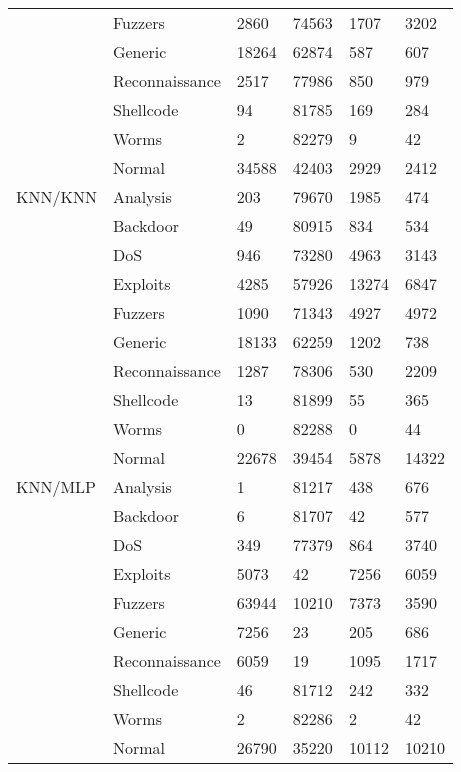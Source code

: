 \begin{longtable}{@{}llllll@{}}
        & Fuzzers        & 2860  & 74563 & 1707  & 3202  \\
        & Generic        & 18264 & 62874 & 587   & 607   \\
        & Reconnaissance & 2517  & 77986 & 850   & 979   \\
        & Shellcode      & 94    & 81785 & 169   & 284   \\
        & Worms          & 2     & 82279 & 9     & 42    \\
        & Normal         & 34588 & 42403 & 2929  & 2412  \\
KNN/KNN & Analysis       & 203   & 79670 & 1985  & 474   \\
        & Backdoor       & 49    & 80915 & 834   & 534   \\
        & DoS            & 946   & 73280 & 4963  & 3143  \\
        & Exploits       & 4285  & 57926 & 13274 & 6847  \\
        & Fuzzers        & 1090  & 71343 & 4927  & 4972  \\
        & Generic        & 18133 & 62259 & 1202  & 738   \\
        & Reconnaissance & 1287  & 78306 & 530   & 2209  \\
        & Shellcode      & 13    & 81899 & 55    & 365   \\
        & Worms          & 0     & 82288 & 0     & 44    \\
        & Normal         & 22678 & 39454 & 5878  & 14322 \\
KNN/MLP & Analysis       & 1     & 81217 & 438   & 676   \\
        & Backdoor       & 6     & 81707 & 42    & 577   \\
        & DoS            & 349   & 77379 & 864   & 3740  \\
        & Exploits       & 5073  & 42    & 7256  & 6059  \\
        & Fuzzers        & 63944 & 10210 & 7373  & 3590  \\
        & Generic        & 7256  & 23    & 205   & 686   \\
        & Reconnaissance & 6059  & 19    & 1095  & 1717  \\
        & Shellcode      & 46    & 81712 & 242   & 332   \\
        & Worms          & 2     & 82286 & 2     & 42    \\
        & Normal         & 26790 & 35220 & 10112 & 10210 \\

\end{longtable}
